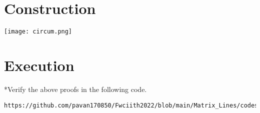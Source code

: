\documentclass[10pt, a4paper]{article}
\begin{document}
\section{Construction}
\texttt{[image: circum.png]} 
    
\section{Execution}
*Verify the above proofs in the following code.\\
\begin{lstlisting}
https://github.com/pavan170850/Fwciith2022/blob/main/Matrix_Lines/codes/para.py
\end{lstlisting}
	


\end{document}
